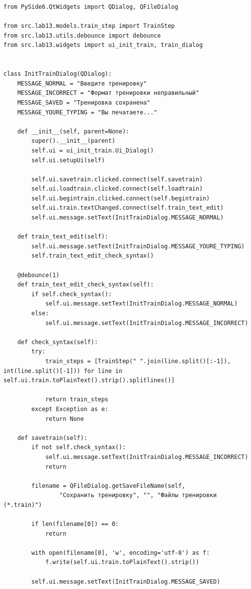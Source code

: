 \documentclass[a4paper,14pt]{extarticle}
\begin{document}
\begin{verbatim}
from PySide6.QtWidgets import QDialog, QFileDialog

from src.lab13.models.train_step import TrainStep
from src.lab13.utils.debounce import debounce
from src.lab13.widgets import ui_init_train, train_dialog


class InitTrainDialog(QDialog):
    MESSAGE_NORMAL = "Введите тренировку"
    MESSAGE_INCORRECT = "Формат тренировки неправильный"
    MESSAGE_SAVED = "Тренировка сохранена"
    MESSAGE_YOURE_TYPING = "Вы печатаете..."

    def __init__(self, parent=None):
        super().__init__(parent)
        self.ui = ui_init_train.Ui_Dialog()
        self.ui.setupUi(self)

        self.ui.savetrain.clicked.connect(self.savetrain)
        self.ui.loadtrain.clicked.connect(self.loadtrain)
        self.ui.begintrain.clicked.connect(self.begintrain)
        self.ui.train.textChanged.connect(self.train_text_edit)
        self.ui.message.setText(InitTrainDialog.MESSAGE_NORMAL)

    def train_text_edit(self):
        self.ui.message.setText(InitTrainDialog.MESSAGE_YOURE_TYPING)
        self.train_text_edit_check_syntax()

    @debounce(1)
    def train_text_edit_check_syntax(self):
        if self.check_syntax():
            self.ui.message.setText(InitTrainDialog.MESSAGE_NORMAL)
        else:
            self.ui.message.setText(InitTrainDialog.MESSAGE_INCORRECT)

    def check_syntax(self):
        try:
            train_steps = [TrainStep(" ".join(line.split()[:-1]), int(line.split()[-1])) for line in self.ui.train.toPlainText().strip().splitlines()]

            return train_steps
        except Exception as e:
            return None

    def savetrain(self):
        if not self.check_syntax():
            self.ui.message.setText(InitTrainDialog.MESSAGE_INCORRECT)
            return

        filename = QFileDialog.getSaveFileName(self,
                "Сохранить тренировку", "", "Файлы тренировки (*.train)")

        if len(filename[0]) == 0:
            return

        with open(filename[0], 'w', encoding='utf-8') as f:
            f.write(self.ui.train.toPlainText().strip())

        self.ui.message.setText(InitTrainDialog.MESSAGE_SAVED)


\end{verbatim}
\end{document}
